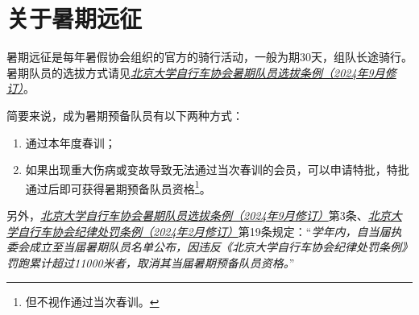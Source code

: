 \documentclass[UTF8]{ctexart}
\begin{document}
\section{关于暑期远征}

暑期远征是每年暑假协会组织的官方的骑行活动，一般为期30天，组队长途骑行。暑期队员的选拔方式请见\href{https://chexie.net/bbs/content/?bid=1&tid=9983&p=1}{\textit{北京大学自行车协会暑期队员选拔条例（2024年9月修订）}}。

简要来说，成为暑期预备队员有以下两种方式：
\begin{enumerate}[nosep,left=4em]
    \item 通过本年度春训；
    \item 如果出现重大伤病或变故导致无法通过当次春训的会员，可以申请特批，特批通过后即可获得暑期预备队员资格\footnote{但不视作通过当次春训。}。
\end{enumerate}

另外，\href{https://chexie.net/bbs/content/?bid=1&tid=9983&p=1}{\textit{北京大学自行车协会暑期队员选拔条例（2024年9月修订）}}第3条、\href{https://chexie.net/bbs/content/?bid=1&tid=9751&p=1}{\textit{北京大学自行车协会纪律处罚条例（2024年2月修订）}}第19条规定：“\textit{学年内，自当届执委会成立至当届暑期队员名单公布，因违反《北京大学自行车协会纪律处罚条例》罚跑累计超过11000米者，取消其当届暑期预备队员资格。}”






\end{document}
